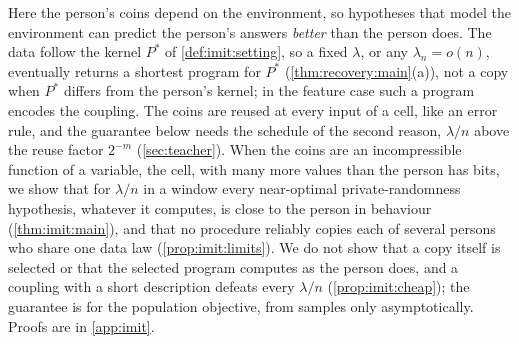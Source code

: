 Here the person's coins depend on the environment, so hypotheses that model the environment can predict the person's answers \emph{better} than the person does. The data follow the kernel $P^*$ of \cref{def:imit:setting}, so a fixed $\lambda$, or any $\lambda_n=o(n)$, eventually returns a shortest program for $P^*$ (\cref{thm:recovery:main}(a)), not a copy when $P^*$ differs from the person's kernel; in the feature case such a program encodes the coupling. The coins are reused at every input of a cell, like an error rule, and the guarantee below needs the schedule of the second reason, $\lambda/n$ above the reuse factor $2^{-m}$ (\cref{sec:teacher}). When the coins are an incompressible function of a variable, the cell, with many more values than the person has bits, we show that for $\lambda/n$ in a window every near-optimal private-randomness hypothesis, whatever it computes, is close to the person in behaviour (\cref{thm:imit:main}), and that no procedure reliably copies each of several persons who share one data law (\cref{prop:imit:limits}). We do not show that a copy itself is selected or that the selected program computes as the person does, and a coupling with a short description defeats every $\lambda/n$ (\cref{prop:imit:cheap}); the guarantee is for the population objective, from samples only asymptotically. Proofs are in \cref{app:imit}.

